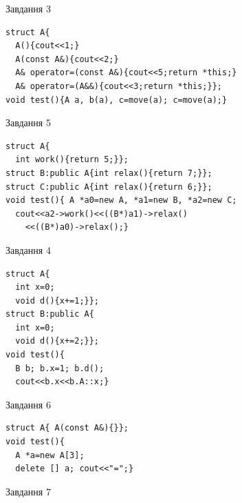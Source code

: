 \documentclass[12pt, ukrainian]{article}
\begin{document}
{{{{{{{{\begin{minipage}[t]{11cm}
               
{\begin{center}Завдання {3}\end{center}}
\vspace{-6mm}

\begin{verbatim}
struct A{
  A(){cout<<1;}
  A(const A&){cout<<2;}
  A& operator=(const A&){cout<<5;return *this;}
  A& operator=(A&&){cout<<3;return *this;}};
void test(){A a, b(a), c=move(a); c=move(a);}
\end{verbatim}            


               
{\begin{center}Завдання {5}\end{center}}
\vspace{-6mm}

\begin{verbatim}
struct A{
  int work(){return 5;}};
struct B:public A{int relax(){return 7;}};
struct C:public A{int relax(){return 6;}};
void test(){ A *a0=new A, *a1=new B, *a2=new C;
  cout<<a2->work()<<((B*)a1)->relax()
    <<((B*)a0)->relax();}
\end{verbatim}            


\end{minipage}
\vline \hspace{8mm}
\begin{minipage}[t]{7cm}
               
{\begin{center}Завдання {4}\end{center}}
\vspace{-6mm}

\begin{verbatim}
struct A{
  int x=0;
  void d(){x+=1;}};
struct B:public A{
  int x=0;
  void d(){x+=2;}};
void test(){
  B b; b.x=1; b.d();
  cout<<b.x<<b.A::x;}
\end{verbatim}            


               
{\begin{center}Завдання {6}\end{center}}
\vspace{-6mm}

\begin{verbatim}
struct A{ A(const A&){}};
void test(){
  A *a=new A[3]; 
  delete [] a; cout<<"=";} 
\end{verbatim}            


               
{\begin{center}Завдання {7}\end{center}}
\vspace{-6mm}


\end{minipage}}}}}}}}}
\end{document}

